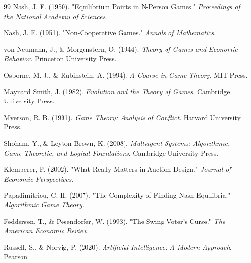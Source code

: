 \documentclass[12pt]{article}
\begin{document}




\footnotesize{
    \begin{thebibliography}{99}
        Nash, J. F. (1950). "Equilibrium Points in N-Person Games." \textit{Proceedings of the National Academy of Sciences}.

        Nash, J. F. (1951). "Non-Cooperative Games." \textit{Annals of Mathematics}.

        von Neumann, J., \& Morgenstern, O. (1944). \textit{Theory of Games and Economic Behavior}. Princeton University Press.

        Osborne, M. J., \& Rubinstein, A. (1994). \textit{A Course in Game Theory}. MIT Press.

        Maynard Smith, J. (1982). \textit{Evolution and the Theory of Games}. Cambridge University Press.

        Myerson, R. B. (1991). \textit{Game Theory: Analysis of Conflict}. Harvard University Press.

        Shoham, Y., \& Leyton-Brown, K. (2008). \textit{Multiagent Systems: Algorithmic, Game-Theoretic, and Logical Foundations}. Cambridge University Press.

        Klemperer, P. (2002). "What Really Matters in Auction Design." \textit{Journal of Economic Perspectives}.

        Papadimitriou, C. H. (2007). "The Complexity of Finding Nash Equilibria." \textit{Algorithmic Game Theory}. 

        Feddersen, T., \& Pesendorfer, W. (1993). "The Swing Voter's Curse." \textit{The American Economic Review}.

        Russell, S., \& Norvig, P. (2020). \textit{Artificial Intelligence: A Modern Approach}. Pearson
        \end{thebibliography}
   }     
        
\end{document}
